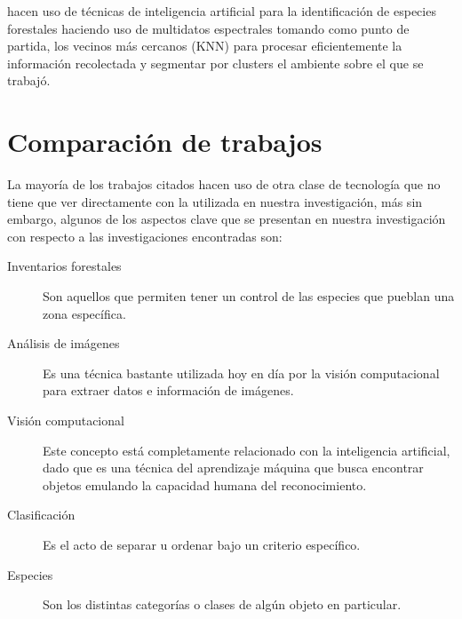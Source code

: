 \citet{rf10} hacen uso de técnicas de inteligencia artificial para la identificación  de especies forestales haciendo uso de multidatos espectrales tomando como punto de partida, los vecinos más cercanos (KNN) para procesar eficientemente la información recolectada y segmentar por clusters el ambiente sobre el que se trabajó.

\pagebreak
 
\section{Comparación de trabajos}
La mayoría de los trabajos citados hacen uso de otra clase de tecnología que no tiene que ver directamente con la utilizada en nuestra investigación, más sin embargo, algunos de los aspectos clave que se presentan en nuestra investigación con respecto a las investigaciones encontradas son:

\begin{description}
\item[Inventarios forestales]{ Son aquellos que permiten tener un control de las especies que pueblan una zona específica.}
\end{description}

\begin{description}
\item[Análisis de imágenes]{Es una técnica bastante utilizada hoy en día por la visión computacional para extraer datos e información de imágenes.}
\end{description}

\begin{description}
\item[Visión computacional]{Este concepto está completamente relacionado con la inteligencia artificial, dado que es una  técnica del aprendizaje máquina que busca encontrar objetos emulando la capacidad humana del reconocimiento.}
\end{description}

\begin{description}
\item[Clasificación]{Es el acto de separar u ordenar bajo un criterio específico.}
\end{description}

\begin{description}
\item[Especies]{Son los distintas categorías o  clases de algún objeto en particular.}
\end{description}

